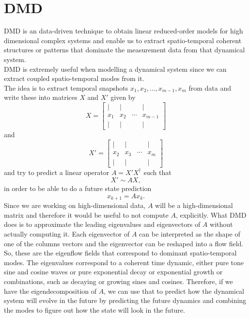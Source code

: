 \documentclass[]{article}
\begin{document}
\section{DMD}
DMD is an data-driven technique to obtain linear reduced-order models for high dimensional complex systems and enable us to extract spatio-temporal coherent structures or patterns that dominate the measurement data from that dynamical system. \\
DMD is extremely useful when modelling a dynamical system since we can extract coupled spatio-temporal modes from it. \\
The idea is to extract temporal snapshots $x_1,x_2,\dots,x_{m-1},x_m$ from data and write these into matrices $X$ and $X'$ given by
\begin{equation}
	X = \begin{bmatrix}
			| & | & & | \\
			x_1 & x_2 & \cdots & x_{m-1} \\
			| & | & & |
	\end{bmatrix}
\end{equation}
and
\begin{equation}
	X' = \begin{bmatrix}
		| & | & & | \\
		x_2 & x_3 & \cdots & x_{m} \\
		| & | & & |
	\end{bmatrix}
\end{equation}
and try to predict a linear operator $A=X'X^{\dagger}$ such that
\begin{equation}
	X' \sim AX,
\end{equation}
in order to be able to do a future state prediction
\begin{equation}
	x_{k+1}=Ax_k.
\end{equation}
Since we are working on high-dimensional data, $A$ will be a high-dimensional matrix and therefore it would be useful to not compute $A$, explicitly. What DMD does is to approximate the leading eigenvalues and eigenvectors of $A$ without actually computing it. Each eigenvector of $A$ can be interpreted as the shape of one of the columns vectors and the eigenvector can be reshaped into a flow field. So, these are the eigenflow fields that correspond to dominant spatio-temporal modes. The eigenvalues correspond to a coherent time dynamic, either pure tone sine and cosine waves or pure exponential decay or exponential growth or combinations, such as decaying or growing sines and cosines. Therefore, if we have the eigendecomposition of $A$, we can use that to predict how the dynamical system will evolve in the future by predicting the future dynamics and combining the modes to figure out how the state will look in the future.
\end{document}
